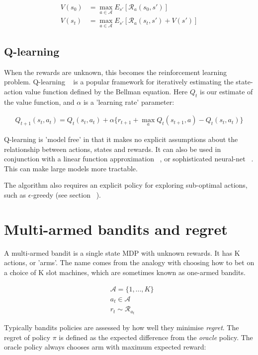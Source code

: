 \documentclass[11pt,a4,singlespacing,titlepagenumber=on]{scrreprt}
\numberwithin{equation}{chapter} %
\theoremstyle{remark}
\begin{document}
\begin{align}
	V(s_0) &= \max_{a \in \mathcal{A}} E_{s'}[\mathcal{R}_a(s_0,s')] \\
	V(s_t) &= \max_{a \in \mathcal{A}} E_{s'}[\mathcal{R}_a(s_t,s') + V(s')]
\end{align}

\subsection{ Q-learning }

When the rewards are unknown, this becomes the reinforcement learning problem. Q-learning ~\cite{watkins1992q} is a popular framework for iteratively estimating the state-action value function defined by the Bellman equation. Here $Q_t$ is our estimate of the value function, and $\alpha$ is a 'learning rate' parameter:

\begin{align}
Q_{t+1}(s_t,a_t) = Q_t(s_t,a_t) + \alpha\{r_{t+1} + \max_a Q_t(s_{t+1},a) -Q_t(s_t,a_t)\}
\end{align}

Q-learning is 'model free' in that it makes no explicit assumptions about the relationship between actions, states and rewards. It can also be used in conjunction with a linear function approximation ~\cite{tsitsiklis1997analysis}, or sophisticated neural-net ~\cite{mnih2013playing}. This can make large models more tractable.

The algorithm also requires an explicit policy for exploring sub-optimal actions, such as $\epsilon$-greedy (see section ~).

\section{ Multi-armed bandits and regret}

A multi-armed bandit is a single state MDP with unknown rewards. It has K actions, or 'arms'. The name comes from the analogy with choosing how to bet on a choice of K slot machines, which are sometimes known as one-armed bandits.

\begin{align}
&\mathcal{A} = \{1,...,K\} \\
&a_t \in \mathcal{A} \\
&r_t \sim \mathcal{R}_{a_t} 
\end{align}

Typically bandits policies are assessed by how well they minimise \textit{regret}. The regret of policy $\pi$ is defined as the expected difference from the \textit{oracle} policy. The oracle policy always chooses arm with maximum expected reward:
\end{document}
